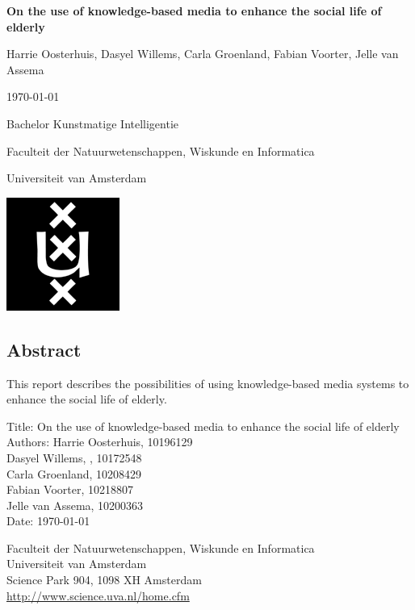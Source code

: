 \documentclass[12pt, a4paper]{article}
\renewcommand{\title}{On the use of knowledge-based media to enhance the social life of elderly}
\newcommand{\authorA}{Harrie Oosterhuis}
\newcommand{\studnummerA}{10196129}
\newcommand{\authorB}{Dasyel Willems}
\newcommand{\studnummerB}{10172548}
\newcommand{\authorC}{Carla Groenland}
\newcommand{\studnummerC}{10208429}
\newcommand{\authorD}{Fabian Voorter}
\newcommand{\studnummerD}{10218807}
\newcommand{\authorE}{Jelle van Assema}
\newcommand{\studnummerE}{10200363}
\newcommand{\einddatum}{\today}
\begin{document}
\begin{titlepage}
\vspace*{10pt}
\begin{center}
{\LARGE \textbf{\bf \title}\par}\bigskip
{\Large \authorA, \authorB, \authorC, \authorD, \authorE
\par}\bigskip
{\Large \einddatum\par}\bigskip\bigskip
{}
Bachelor Kunstmatige Intelligentie \par\smallskip
Faculteit der Natuurwetenschappen, Wiskunde en Informatica\par\smallskip
Universiteit van Amsterdam\par\bigskip
\includegraphics[width=0.075\hsize]{uvalogo}
\end{center}
\end{titlepage}

\begin{titlepage}
\noindent
\begin{minipage}{0.85\hsize}
\section*{Abstract}
This report describes the possibilities of using knowledge-based media systems to enhance the social life of elderly. 
\end{minipage}

\vfill

\noindent Title: \title\\
Authors: \authorA, \studnummerA\\
\hphantom{Authors: }\authorB, , \studnummerB\\
\hphantom{Authors:\ }\authorC,  \studnummerC\\
\hphantom{Authors:\ }\authorD,  \studnummerD\\
\hphantom{Authors:\ }\authorE, \studnummerE\\
Date: \einddatum

\bigskip\noindent
Faculteit der Natuurwetenschappen, Wiskunde en Informatica\\
Universiteit van Amsterdam\\
Science Park 904, 1098 XH Amsterdam\\
\url{http://www.science.uva.nl/home.cfm}
\end{titlepage}
\end{document}
